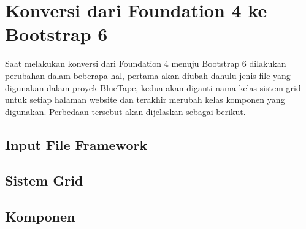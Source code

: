 \chapter{Konversi dari Foundation 4 ke Bootstrap 6}
Saat melakukan konversi dari Foundation 4 menuju Bootstrap 6 dilakukan perubahan dalam beberapa hal, pertama akan diubah dahulu jenis file yang digunakan dalam proyek BlueTape, kedua akan diganti nama kelas sistem grid untuk setiap halaman website dan terakhir merubah kelas komponen yang digunakan. Perbedaan tersebut akan dijelaskan sebagai berikut.
\section{Input File Framework}
\section{Sistem Grid}
\section{Komponen}


